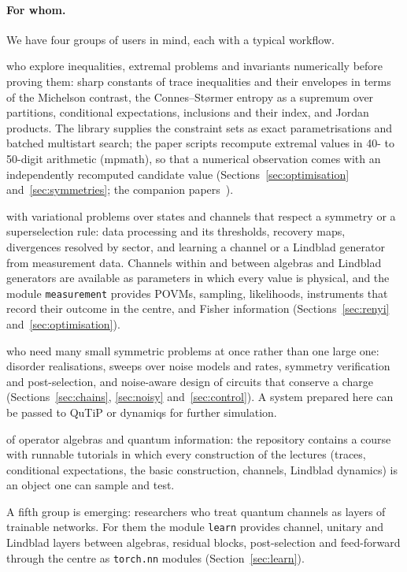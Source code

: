 \documentclass[11pt]{article}
\begin{document}
\paragraph{For whom.} We have four groups of users in mind, each with a typical workflow.
\begin{description}\itemsep2pt
\item[Operator algebraists] who explore inequalities, extremal problems and invariants numerically before proving
them: sharp constants of trace inequalities and their envelopes in terms of the Michelson contrast, the
Connes--St{\o}rmer entropy as a supremum over partitions, conditional expectations, inclusions and their index, and
Jordan products. The library supplies the constraint sets as exact parametrisations and batched multistart search;
the paper scripts recompute extremal values in 40- to 50-digit arithmetic (mpmath), so that a numerical observation
comes with an independently recomputed candidate value (Sections~\ref{sec:optimisation} and~\ref{sec:symmetries}; the companion papers~\cite{nn_trace,nn_cs}).
\item[Quantum information theorists] with variational problems over states and channels that respect a symmetry or a
superselection rule: data processing and its thresholds, recovery maps, divergences resolved by sector, and learning a
channel or a Lindblad generator from measurement data. Channels within and between algebras and Lindblad generators are
available as parameters in which every value is physical, and the module \texttt{measurement} provides POVMs,
sampling, likelihoods, instruments that record their outcome in the centre, and Fisher information
(Sections~\ref{sec:renyi} and~\ref{sec:optimisation}).
\item[Physicists with conserved charges] who need many small symmetric problems at once rather than one large one:
disorder realisations, sweeps over noise models and rates, symmetry verification and post-selection, and noise-aware
design of circuits that conserve a charge (Sections~\ref{sec:chains}, \ref{sec:noisy} and~\ref{sec:control}). A system
prepared here can be passed to QuTiP or dynamiqs for further simulation.
\item[Teachers and students] of operator algebras and quantum information: the repository contains a course with
runnable tutorials in which every construction of the lectures (traces, conditional expectations, the basic
construction, channels, Lindblad dynamics) is an object one can sample and test.
\end{description}
A fifth group is emerging: researchers who treat quantum channels as layers of trainable networks. For them the
module \texttt{learn} provides channel, unitary and Lindblad layers between algebras, residual blocks, post-selection
and feed-forward through the centre as \texttt{torch.nn} modules (Section~\ref{sec:learn}).
\end{document}
